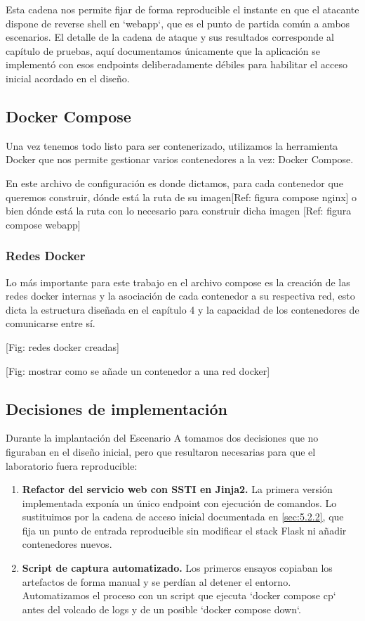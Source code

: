 \documentclass[11pt,spanish,listoffigures,listoftables]{tfgetsinf}
\begin{document}
        Esta cadena nos permite fijar de forma reproducible el instante en que el atacante dispone de reverse shell en `webapp`, que es el punto de partida común a ambos escenarios. El detalle de la cadena de ataque y sus resultados corresponde al capítulo de pruebas, aquí documentamos únicamente que la aplicación se implementó con esos endpoints deliberadamente débiles para habilitar el acceso inicial acordado en el diseño.
        
        
        \subsection{Docker Compose}
        Una vez tenemos todo listo para ser contenerizado, utilizamos la herramienta Docker que nos permite gestionar varios contenedores a la vez: Docker Compose.

        En este archivo de configuración es donde dictamos, para cada contenedor que queremos construir, dónde está la ruta de su imagen[Ref: figura compose nginx] o bien dónde está la ruta con lo necesario para construir dicha imagen [Ref: figura compose webapp]

        \subsubsection{Redes Docker}
            Lo más importante para este trabajo en el archivo compose es la creación de las redes docker internas y la asociación de cada contenedor a su respectiva red, esto dicta la estructura diseñada en el capítulo 4 y la capacidad de los contenedores de comunicarse entre sí.

            [Fig: redes docker creadas]

            [Fig: mostrar como se añade un contenedor a una red docker]
        
        \subsection{Decisiones de implementación}
        \label{sec:5.2.3}

        Durante la implantación del Escenario A tomamos dos decisiones que no figuraban en el diseño inicial, pero que resultaron necesarias para que el laboratorio fuera reproducible:
        \begin{enumerate}
            \item \textbf{Refactor del servicio web con SSTI en Jinja2.} La primera versión implementada exponía un único endpoint con ejecución de comandos. Lo sustituimos por la cadena de acceso inicial documentada en \cref{sec:5.2.2}, que fija un punto de entrada reproducible sin modificar el stack Flask ni añadir contenedores nuevos.
            \item \textbf{Script de captura automatizado.} Los primeros ensayos copiaban los artefactos de forma manual y se perdían al detener el entorno. Automatizamos el proceso con un script que ejecuta `docker compose cp` antes del volcado de logs y de un posible `docker compose down`.
        \end{enumerate}
\end{document}
